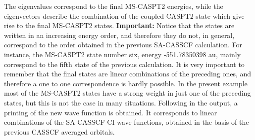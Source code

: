 The eigenvalues correspond to the final MS-CASPT2 energies, while the eigenvectors
describe the combination of the coupled CASPT2 state which give rise to the final
MS-CASPT2 states. {\bf Important:} Notice that the states are written in an increasing
energy order, and therefore they do not, in general, correspond to the order 
obtained in the previous SA-CASSCF calculation. For instance, the MS-CASPT2
state number six, energy -551.78350398 au, mainly correspond to the fifth state
of the previous calculation. It is very important to remember that the final 
states are linear combinations of the preceding ones, and therefore a one to
one correspondence is hardly possible. In the present example most of the MS-CASPT2
states have a strong weight in just one of the preceding states, but this is not
the case in many situations. Following in the output, a printing of the new
wave function is obtained. It corresponds to linear combinations of the SA-CASSCF
CI wave functions, obtained in the basis of the previous CASSCF averaged orbitals.

